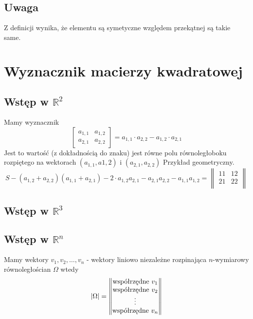 \documentclass[11pt]{article}
\begin{document}
\subsection{Uwaga}
Z definicji wynika, że elementu są symetyczne względem przekątnej są takie same.
\section{Wyznacznik macierzy kwadratowej}
\subsection{Wstęp w $\mathbb{R}^2$}
Mamy wyznacznik $$\begin{bmatrix} a_{1,1} & a_{1,2} \\ a_{2,1} & a_{2,2} \end{bmatrix} = a_{1,1}\cdot a_{2,2} - a_{1,2} \cdot a_{2,1}$$
Jest to wartość (z dokładnością do znaku) jest równe polu równoległoboku rozpiętego na wektorach $(a_{1,1},a{1,2})$ i $(a_{2,1},a_{2,2})$
Przykład geometryczny.
$$ S - (a_{1,2} + a_{2,2})(a_{1,1} + a_{2,1}) - 2\cdot a_{1,2} a_{2,1} - a_{2,1}a_{2,2} - a_{1,1}a_{1,2} = \begin{Vmatrix}
	11 & 12\\
	21 & 22\\
\end{Vmatrix}$$
\subsection{Wstęp w $\mathbb{R}^3$}
\subsection{Wstęp w $\mathbb{R}^n$}
Mamy wektory $v_1,v_2,\ldots,v_n$ - wektory liniowo niezależne rozpinająca $n$-wymiarowy równoległościan $\Omega$ wtedy 
$$ |\Omega| = \begin{Vmatrix}
	\hbox{współrzędne } v_1 \\
	\hbox{współrzędne } v_2 \\
	\vdots \\
	\hbox{współrzędne } v_n \\
\end{Vmatrix}$$
\end{document}

